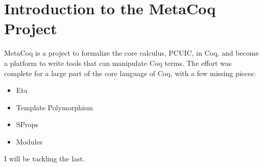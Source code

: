 \chapter{Introduction to the MetaCoq Project}
MetaCoq is a project to formalize the core calculus, PCUIC, in Coq, and become
a platform to write tools that can manipulate Coq terms. The effort was complete
for a large part of the core language of Coq, with a few missing pieces:

\begin{itemize}
    \item Eta 
    \item Template Polymorphism
    \item SProps
    \item Modules
\end{itemize}

I will be tackling the last.